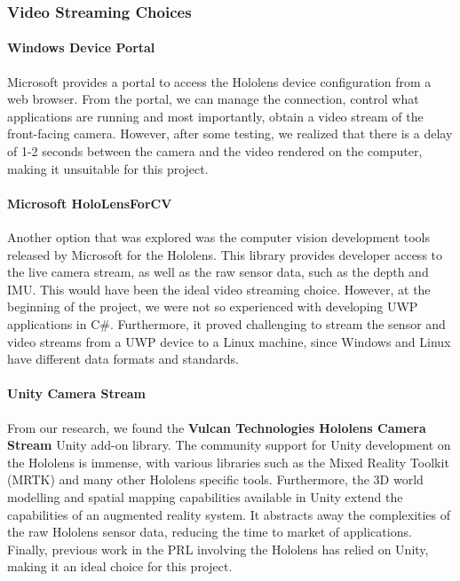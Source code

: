 \subsubsection{Video Streaming Choices} \label{sec:videoStreaming}

\paragraph{Windows Device Portal} Microsoft provides a portal to access the Hololens device configuration from a web browser. From the portal, we can manage the connection, control what applications are running and most importantly, obtain a video stream of the front-facing camera. However, after some testing, we realized that there is a delay of 1-2 seconds between the camera and the video rendered on the computer, making it unsuitable for this project.

\paragraph{Microsoft HoloLensForCV} Another option that was explored was the computer vision development tools released by Microsoft for the Hololens. This library provides developer access to the live camera stream, as well as the raw sensor data, such as the depth and IMU. This would have been the ideal video streaming choice. However, at the beginning of the project, we were not so experienced with developing UWP applications in C\#. Furthermore, it proved challenging to stream the sensor and video streams from a UWP device to a Linux machine, since Windows and Linux have different data formats and standards.

\paragraph{Unity Camera Stream} From our research, we found the \textbf{Vulcan Technologies Hololens Camera Stream} Unity add-on library. The community support for Unity development on the Hololens is immense, with various libraries such as the Mixed Reality Toolkit (MRTK) and many other Hololens specific tools. Furthermore, the 3D world modelling and spatial mapping capabilities available in Unity extend the capabilities of an augmented reality system. It abstracts away the complexities of the raw Hololens sensor data, reducing the time to market of applications. Finally, previous work in the PRL involving the Hololens has relied on Unity, making it an ideal choice for this project.

